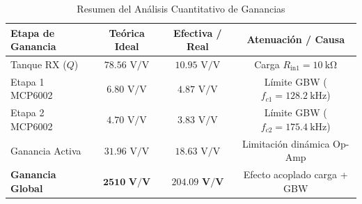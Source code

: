 \begin{table}[htbp]
\caption{Resumen del Análisis Cuantitativo de Ganancias}
\label{tab:ganancias}
\centering
\begin{tabular}{lccc}
\toprule
\textbf{Etapa de Ganancia} & \textbf{Teórica Ideal} & \textbf{Efectiva / Real} & \textbf{Atenuación / Causa} \\
\midrule
Tanque RX ($Q$) & $78.56\text{ V/V}$ & $10.95\text{ V/V}$ & Carga $R_{\text{in1}} = \SI{10}{\kilo\ohm}$ \\
Etapa 1 MCP6002 & $6.80\text{ V/V}$ & $4.87\text{ V/V}$ & Límite GBW ($f_{c1} = \SI{128.2}{\kilo\hertz}$) \\
Etapa 2 MCP6002 & $4.70\text{ V/V}$ & $3.83\text{ V/V}$ & Límite GBW ($f_{c2} = \SI{175.4}{\kilo\hertz}$) \\
Ganancia Activa & $31.96\text{ V/V}$ & $18.63\text{ V/V}$ & Limitación dinámica Op-Amp \\
\textbf{Ganancia Global} & $\mathbf{2510\text{ V/V}}$ & $\mathbf{204.09\text{ V/V}}$ & Efecto acoplado carga + GBW \\
\bottomrule
\end{tabular}
\end{table}

